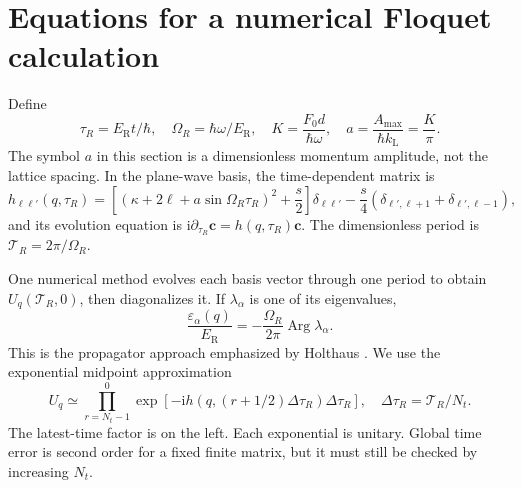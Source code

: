 \documentclass[11pt,oneside]{report}
\numberwithin{equation}{chapter}
\newcommand{\ER}{E_{\mathrm R}}
\newcommand{\ii}{\mathrm i}
\begin{document}
\section{Equations for a numerical Floquet calculation}
Define
\begin{equation}
 \tau_R=\ER t/\hbar,\quad \Omega_R=\hbar\omega/\ER,\quad
 K=\frac{F_0d}{\hbar\omega},\quad a=\frac{A_{\max}}{\hbar k_{\mathrm L}}=\frac{K}{\pi}.
\end{equation}
The symbol $a$ in this section is a dimensionless momentum amplitude, not the lattice spacing. In the plane-wave basis, the time-dependent matrix is
\begin{equation}\label{eq:continuumtime}
 h_{\ell\ell'}(q,\tau_R)=\left[(\kappa+2\ell+a\sin\Omega_R\tau_R)^2+\frac{s}{2}\right]\delta_{\ell\ell'}-\frac{s}{4}(\delta_{\ell',\ell+1}+\delta_{\ell',\ell-1}),
\end{equation}
and its evolution equation is $\ii\partial_{\tau_R}\bm c=h(q,\tau_R)\bm c$. The dimensionless period is $\mathcal T_R=2\pi/\Omega_R$.

One numerical method evolves each basis vector through one period to obtain $U_q(\mathcal T_R,0)$, then diagonalizes it. If $\lambda_\alpha$ is one of its eigenvalues,
\begin{equation}\label{eq:eigenphase}
 \frac{\varepsilon_\alpha(q)}{\ER}=-\frac{\Omega_R}{2\pi}\operatorname{Arg}\lambda_\alpha.
\end{equation}
This is the propagator approach emphasized by Holthaus \cite{Holthaus2016}. We use the exponential midpoint approximation
\begin{equation}\label{eq:midpoint}
 U_q\simeq\prod_{r=N_t-1}^{0}\exp[-\ii h(q,(r+1/2)\Delta\tau_R)\Delta\tau_R],\quad \Delta\tau_R=\mathcal T_R/N_t.
\end{equation}
The latest-time factor is on the left. Each exponential is unitary. Global time error is second order for a fixed finite matrix, but it must still be checked by increasing $N_t$.
\end{document}
